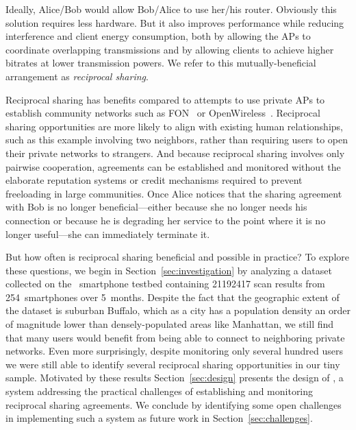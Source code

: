 Ideally, Alice/Bob would allow Bob/Alice to use her/his router. Obviously
this solution requires less hardware. But it also improves performance while
reducing interference and client energy consumption, both by allowing the APs
to coordinate overlapping transmissions and by allowing clients to achieve
higher bitrates at lower transmission powers. We refer to this
mutually-beneficial arrangement as \textit{reciprocal \wifi{} sharing}.

Reciprocal \wifi{} sharing has benefits compared to attempts to use private
APs to establish community networks such as FON~\cite{fon} or
OpenWireless~\cite{openwireless}. Reciprocal \wifi{} sharing opportunities
are more likely to align with existing human relationships, such as this
example involving two neighbors, rather than requiring users to open their
private networks to strangers. And because reciprocal \wifi{} sharing
involves only pairwise cooperation, agreements can be established and
monitored without the elaborate reputation systems or credit mechanisms
required to prevent freeloading in large communities. Once Alice notices that
the sharing agreement with Bob is no longer beneficial---either because she
no longer needs his connection or because he is degrading her service to the
point where it is no longer useful---she can immediately terminate it.

But how often is reciprocal \wifi{} sharing beneficial and possible in
practice? To explore these questions, we begin in
Section~\ref{sec:investigation} by analyzing a dataset collected on the
\PhoneLab{}~smartphone testbed containing \num{21192417} \wifi{} scan results
from 254~smartphones over 5~months. Despite the
fact that the geographic extent of the dataset is suburban Buffalo, which as
a city has a population density an order of magnitude lower than
densely-populated areas like Manhattan, we still find that many users would
benefit from being able to connect to neighboring private networks. Even more
surprisingly, despite monitoring only several hundred users we were still
able to identify several reciprocal \wifi{} sharing opportunities in our tiny
sample. Motivated by these results Section~\ref{sec:design} presents the
design of \wisefi{}, a system addressing the practical challenges of
establishing and monitoring reciprocal \wifi{} sharing agreements. We
conclude by identifying some open challenges in implementing such a system as
future work in Section~\ref{sec:challenges}.
